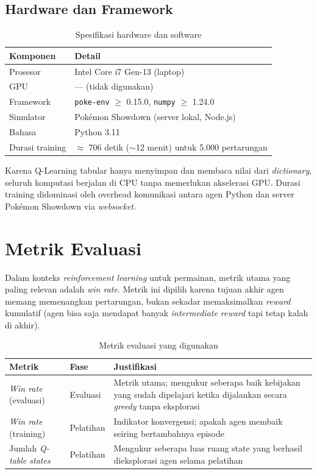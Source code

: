 \documentclass[11pt,a4paper,oneside]{report}
\begin{document}
\subsection*{Hardware dan Framework}

\begin{table}[h!]
\centering
\caption{Spesifikasi hardware dan software}
\label{tab:hardware}
\begin{tabular}{ll}
\toprule
\textbf{Komponen} & \textbf{Detail} \\
\midrule
Prosesor       & Intel Core i7 Gen-13 (laptop) \\
GPU            & --- (tidak digunakan) \\
Framework      & \texttt{poke-env} $\geq$ 0.15.0, \texttt{numpy} $\geq$ 1.24.0 \\
Simulator      & Pokémon Showdown (server lokal, Node.js) \\
Bahasa         & Python 3.11 \\
Durasi training & $\approx$ 706 detik ($\sim$12 menit) untuk 5.000 pertarungan \\
\bottomrule
\end{tabular}
\end{table}

\noindent Karena Q-Learning tabular hanya menyimpan dan membaca nilai dari \textit{dictionary}, seluruh komputasi berjalan di CPU tanpa memerlukan akselerasi GPU. Durasi training didominasi oleh overhead komunikasi antara agen Python dan server Pokémon Showdown via \textit{websocket}.

\section{Metrik Evaluasi}

Dalam konteks \textit{reinforcement learning} untuk permainan, metrik utama yang paling relevan adalah \textit{win rate}. Metrik ini dipilih karena tujuan akhir agen memang memenangkan pertarungan, bukan sekadar memaksimalkan \textit{reward} kumulatif (agen bisa saja mendapat banyak \textit{intermediate reward} tapi tetap kalah di akhir).

\begin{table}[h!]
\centering
\caption{Metrik evaluasi yang digunakan}
\label{tab:metrik}
\begin{tabular}{llp{7cm}}
\toprule
\textbf{Metrik} & \textbf{Fase} & \textbf{Justifikasi} \\
\midrule
\textit{Win rate} (evaluasi) & Evaluasi & Metrik utama; mengukur seberapa baik kebijakan yang sudah dipelajari ketika dijalankan secara \textit{greedy} tanpa eksplorasi \\
\textit{Win rate} (training) & Pelatihan & Indikator konvergensi; apakah agen membaik seiring bertambahnya episode \\
Jumlah \textit{Q-table states} & Pelatihan & Mengukur seberapa luas ruang state yang berhasil dieksplorasi agen selama pelatihan \\
\bottomrule
\end{tabular}
\end{table}
\end{document}
